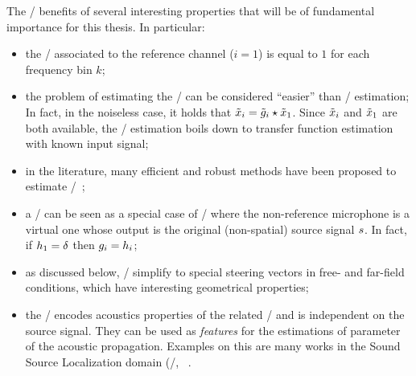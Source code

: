 \mynewline
The \ReTFs/ benefits of several interesting properties that will be of fundamental importance for this thesis.
In particular:
\begin{itemize}
    \item the \ReTF/ associated to the reference channel ($i = 1$) is equal to $1$ for each frequency bin $k$;
    \item the problem of estimating the \ReTF/ can be considered ``easier'' than \RIRs/ estimation;
    In fact, in the noiseless case, it holds that $\tilde{x}_i = \tilde{g}_i \star \tilde{x}_1$.
    Since $\tilde{x}_i$ and $\tilde{x}_1$ are both available, the \ReTF/ estimation boils down to transfer function estimation with known input signal;
    \item in the literature, many efficient and robust methods have been proposed to estimate \ReTFs/~;
    \item a \RIR/ can be seen as a special case of \ReTF/ where the non-reference microphone is a virtual one whose
    output is the original (non-spatial) source signal $s$. In fact, if $h_1 = \delta$ then $g_i = h_i$;
    \item as discussed below, \ReTFs/ simplify to special steering vectors in free- and far-field conditions, which have interesting geometrical properties;
    \item the \ReTF/ encodes acoustics properties of the related \RIRs/ and is independent on the source signal.
    They can be used as \textit{features} for the estimations of parameter of the acoustic propagation.
    Examples on this are many works in the Sound Source Localization domain (\eg/, ~.
\end{itemize}

